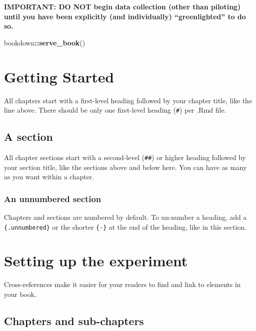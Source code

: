 \documentclass[
]{book}
\newenvironment{Shaded}{\begin{snugshade}}{\end{snugshade}}
\newcommand{\FunctionTok}[1]{\textcolor[rgb]{0.13,0.29,0.53}{\textbf{#1}}}
\newcommand{\NormalTok}[1]{#1}
\newcommand{\SpecialCharTok}[1]{\textcolor[rgb]{0.81,0.36,0.00}{\textbf{#1}}}
\theoremstyle{definition}
\theoremstyle{definition}
\theoremstyle{definition}
\theoremstyle{definition}
\theoremstyle{remark}
\begin{document}
\textbf{IMPORTANT: DO NOT begin data collection (other than piloting) until you have been explicitly (and individually) ``greenlighted'' to do so.}

\begin{Shaded}
\begin{Highlighting}[]
\NormalTok{bookdown}\SpecialCharTok{::}\FunctionTok{serve\_book}\NormalTok{()}
\end{Highlighting}
\end{Shaded}

\hypertarget{getting-started}{%
\chapter{Getting Started}\label{getting-started}}

All chapters start with a first-level heading followed by your chapter title, like the line above. There should be only one first-level heading (\texttt{\#}) per .Rmd file.

\hypertarget{a-section}{%
\section{A section}\label{a-section}}

All chapter sections start with a second-level (\texttt{\#\#}) or higher heading followed by your section title, like the sections above and below here. You can have as many as you want within a chapter.

\hypertarget{an-unnumbered-section}{%
\subsection*{An unnumbered section}\label{an-unnumbered-section}}

Chapters and sections are numbered by default. To un-number a heading, add a \texttt{\{.unnumbered\}} or the shorter \texttt{\{-\}} at the end of the heading, like in this section.

\hypertarget{setting-up-the-experiment}{%
\chapter{Setting up the experiment}\label{setting-up-the-experiment}}

Cross-references make it easier for your readers to find and link to elements in your book.

\hypertarget{chapters-and-sub-chapters}{%
\section{Chapters and sub-chapters}\label{chapters-and-sub-chapters}}
\end{document}
